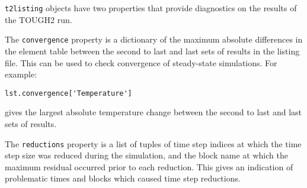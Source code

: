 \texttt{t2listing} objects have two properties that provide diagnostics on the results of the TOUGH2 run.

The \texttt{convergence} property is a dictionary of the maximum absolute differences in the element table between the second to last and last sets of results in the listing file.  This can be used to check convergence of steady-state simulations.  For example:

\begin{lstlisting}
lst.convergence['Temperature']
\end{lstlisting}

gives the largest absolute temperature change between the second to last and last sets of results.

The \texttt{reductions} property is a list of tuples of time step indices at which the time step size was reduced during the simulation, and the block name at which the maximum residual occurred prior to each reduction.  This gives an indication of problematic times and blocks which caused time step reductions.

